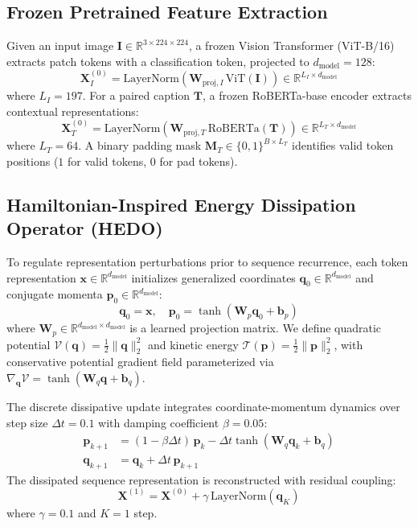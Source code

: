 \documentclass[journal]{IEEEtran}
\begin{document}
\subsection{Frozen Pretrained Feature Extraction}
Given an input image $\mathbf{I} \in \mathbb{R}^{3 \times 224 \times 224}$, a frozen Vision Transformer (ViT-B/16) extracts patch tokens with a classification token, projected to $d_{\text{model}}=128$:
\begin{equation}
\mathbf{X}_I^{(0)} = \text{LayerNorm}\left( \mathbf{W}_{\text{proj}, I} \, \text{ViT}(\mathbf{I}) \right) \in \mathbb{R}^{L_I \times d_{\text{model}}}
\end{equation}
where $L_I = 197$. For a paired caption $\mathbf{T}$, a frozen RoBERTa-base encoder extracts contextual representations:
\begin{equation}
\mathbf{X}_T^{(0)} = \text{LayerNorm}\left( \mathbf{W}_{\text{proj}, T} \, \text{RoBERTa}(\mathbf{T}) \right) \in \mathbb{R}^{L_T \times d_{\text{model}}}
\end{equation}
where $L_T = 64$. A binary padding mask $\mathbf{M}_T \in \{0, 1\}^{B \times L_T}$ identifies valid token positions ($1$ for valid tokens, $0$ for pad tokens).

\subsection{Hamiltonian-Inspired Energy Dissipation Operator (HEDO)}
To regulate representation perturbations prior to sequence recurrence, each token representation $\mathbf{x} \in \mathbb{R}^{d_{\text{model}}}$ initializes generalized coordinates $\mathbf{q}_0 \in \mathbb{R}^{d_{\text{model}}}$ and conjugate momenta $\mathbf{p}_0 \in \mathbb{R}^{d_{\text{model}}}$:
\begin{equation}
\mathbf{q}_0 = \mathbf{x}, \quad \mathbf{p}_0 = \tanh(\mathbf{W}_p \mathbf{q}_0 + \mathbf{b}_p)
\end{equation}
where $\mathbf{W}_p \in \mathbb{R}^{d_{\text{model}} \times d_{\text{model}}}$ is a learned projection matrix. We define quadratic potential $\mathcal{V}(\mathbf{q}) = \frac{1}{2}\|\mathbf{q}\|_2^2$ and kinetic energy $\mathcal{T}(\mathbf{p}) = \frac{1}{2}\|\mathbf{p}\|_2^2$, with conservative potential gradient field parameterized via $\nabla_{\mathbf{q}}\mathcal{V} = \tanh(\mathbf{W}_q \mathbf{q} + \mathbf{b}_q)$.

The discrete dissipative update integrates coordinate-momentum dynamics over step size $\Delta t=0.1$ with damping coefficient $\beta=0.05$:
\begin{align}
\mathbf{p}_{k+1} &= (1 - \beta \Delta t) \, \mathbf{p}_k - \Delta t \tanh(\mathbf{W}_q \mathbf{q}_k + \mathbf{b}_q) \\
\mathbf{q}_{k+1} &= \mathbf{q}_k + \Delta t \, \mathbf{p}_{k+1}
\end{align}
The dissipated sequence representation is reconstructed with residual coupling:
\begin{equation}
\mathbf{X}^{(1)} = \mathbf{X}^{(0)} + \gamma \, \text{LayerNorm}(\mathbf{q}_K)
\end{equation}
where $\gamma = 0.1$ and $K=1$ step.
\end{document}
